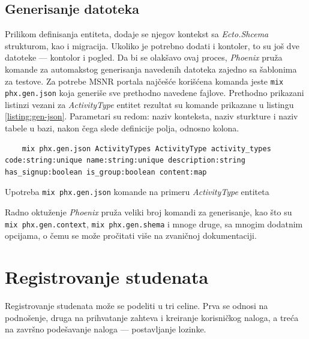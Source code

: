 \documentclass[12pt,oneside]{memoir}
\begin{document}
\subsection{Generisanje datoteka}
Prilikom definisanja entiteta, dodaje se njegov kontekst sa \emph{Ecto.Shcema} strukturom, kao i migracija. 
Ukoliko je potrebno dodati i kontoler, to su još dve datoteke --- kontolor i pogled. Da bi se olakšavo ovaj
proces, \emph{Phoenix} pruža komande za automakstog generisanja navedenih datoteka zajedno sa šablonima za testove.
Za potrebe MSNR portala najčešće korišćena komanda jeste \texttt{mix phx.gen.json} koja generiše sve prethodno
navedene fajlove. Prethodno prikazani listinzi vezani za \emph{ActivityType} entitet rezultat su komande prikazane u
listingu \ref{listing:gen-json}. Parametari su redom: naziv konteksta, naziv sturkture i naziv tabele u bazi, nakon čega slede
definicije polja, odnosno kolona.
\begin{listing}[h]
  \begin{verbatim}
    mix phx.gen.json ActivityTypes ActivityType activity_types code:string:unique name:string:unique description:string has_signup:boolean is_group:boolean content:map
  \end{verbatim}
\caption{Upotreba \texttt{mix phx.gen.json} komande na primeru \emph{ActivityType} entiteta}
\label{listing:gen-json}
\end{listing}
Radno oktuženje \emph{Phoenix} pruža veliki broj komandi za generisanje, kao što su \texttt{mix phx.gen.context}, 
\texttt{mix phx.gen.shema} i mnoge druge, sa mnogim dodatnim opcijama, o čemu se može pročitati više na zvaničnoj dokumentaciji.

\section{Registrovanje studenata}
Registrovanje studenata može se podeliti u tri celine. Prva se odnosi na podnošenje, druga na prihvatanje
zahteva i kreiranje korisničkog naloga, a treća na završno podešavanje naloga --- postavljanje lozinke.
\end{document}
